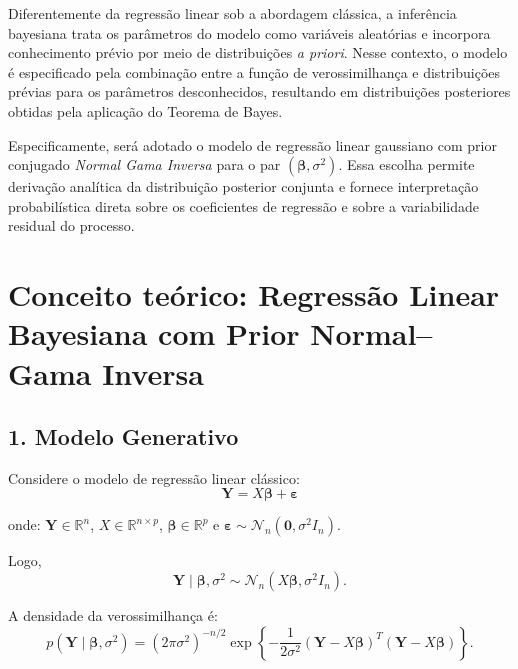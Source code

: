 \documentclass[12pt, a4paper]{article}
\begin{document}
Diferentemente da regressão linear sob a abordagem clássica, a inferência bayesiana trata os parâmetros do modelo como variáveis aleatórias e incorpora conhecimento prévio por meio de distribuições \textit{a priori}. Nesse contexto, o modelo é especificado pela combinação entre a função de verossimilhança e distribuições prévias para os parâmetros desconhecidos, resultando em distribuições posteriores obtidas pela aplicação do Teorema de Bayes.

Especificamente, será adotado o modelo de regressão linear gaussiano com prior conjugado \textit{Normal Gama Inversa} para o par $(\boldsymbol{\beta},\sigma^2)$. Essa escolha permite derivação analítica da distribuição posterior conjunta e fornece interpretação probabilística direta sobre os coeficientes de regressão e sobre a variabilidade residual do processo.



\section*{Conceito teórico: Regressão Linear Bayesiana com Prior Normal–Gama Inversa}

\subsection*{1. Modelo Generativo}

Considere o modelo de regressão linear clássico:
\[ \mathbf{Y} = X\boldsymbol{\beta} + \boldsymbol{\varepsilon} \]

onde: $\mathbf{Y}\in\mathbb{R}^{n}$, $X\in\mathbb{R}^{n\times p}$, $\boldsymbol{\beta}\in\mathbb{R}^{p}$ e $\boldsymbol{\varepsilon}\sim\mathcal{N}_n(\mathbf{0},\sigma^2I_n)$.

Logo,
\[ \mathbf{Y}\mid\boldsymbol{\beta},\sigma^2 \sim \mathcal{N}_n(X\boldsymbol{\beta},\sigma^2I_n). \]

A densidade da verossimilhança é:
\[ p(\mathbf{Y}\mid\boldsymbol{\beta},\sigma^2) = (2\pi\sigma^2)^{-n/2} \exp\left\{ -\frac{1}{2\sigma^2} (\mathbf{Y}-X\boldsymbol{\beta})^T (\mathbf{Y}-X\boldsymbol{\beta}) \right\}. \]
\end{document}
